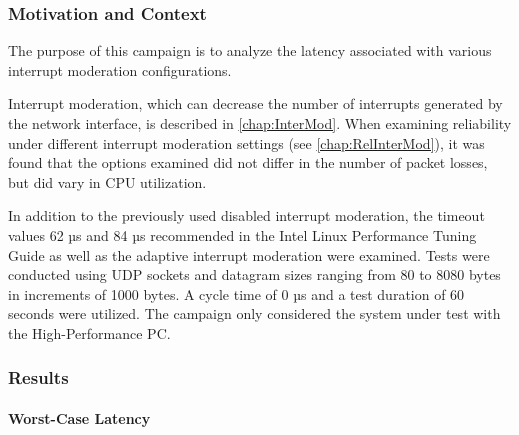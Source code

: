 \subsubsection{Motivation and Context}
The purpose of this campaign is to analyze the latency associated with various interrupt moderation configurations.

Interrupt moderation, which can decrease the number of interrupts generated by the network interface, is described in \ref{chap:InterMod}. When examining reliability under different interrupt moderation settings (see \ref{chap:RelInterMod}), it was found that the options examined did not differ in the number of packet losses, but did vary in CPU utilization.

In addition to the previously used disabled interrupt moderation, the timeout values 62 µs and 84 µs recommended in the Intel Linux Performance Tuning Guide \cite{intermod03} as well as the adaptive interrupt moderation were examined. Tests were conducted using UDP sockets and datagram sizes ranging from 80 to 8080 bytes in increments of 1000 bytes. A cycle time of 0 µs and a test duration of 60 seconds were utilized. The campaign only considered the system under test with the High-Performance PC.

\subsubsection{Results}
\paragraph{Worst-Case Latency}

